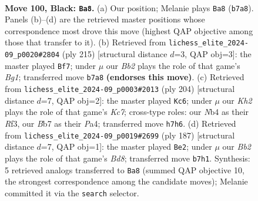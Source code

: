 \documentclass[11pt]{article}
\begin{document}
\clearpage

\begin{figure}[p]\centering
\begin{subfigure}{0.46\textwidth}\centering
\resizebox{\linewidth}{!}{%
\newchessgame
\chessboard[
  setfen={8/1b5k/8/8/1n1B4/7K/5P2/8 b - - 46 100},
  showmover=false,
  pgfstyle=straightmove, color=movearrow, markmove={b7-a8}
]}
\caption{}
\end{subfigure}\hfill
\begin{subfigure}{0.46\textwidth}\centering
\resizebox{\linewidth}{!}{%
\newchessgame
\chessboard[
  setfen={6b1/8/5P2/8/3B4/K7/2k5/8 b - - 30 108},
  showmover=false,
  pgfstyle=straightmove, color=movearrow, markmove={g8-f7}
]}
\caption{}
\end{subfigure}
\\[4pt]
\begin{subfigure}{0.46\textwidth}\centering
\resizebox{\linewidth}{!}{%
\newchessgame
\chessboard[
  setfen={8/2K5/4k3/p7/P7/5R2/3b4/8 w - - 68 103},
  showmover=false,
  pgfstyle=straightmove, color=movearrow, markmove={c7-c6}
]}
\caption{}
\end{subfigure}\hfill
\begin{subfigure}{0.46\textwidth}\centering
\resizebox{\linewidth}{!}{%
\newchessgame
\chessboard[
  setfen={6B1/8/8/8/3k4/P7/1K6/3b4 b - - 10 94},
  showmover=false,
  pgfstyle=straightmove, color=movearrow, markmove={d1-e2}
]}
\caption{}
\end{subfigure}
\caption{\textbf{Move 100, Black: \texttt{Ba8}.} (a) Our position; Melanie plays \texttt{Ba8} (\texttt{b7a8}). Panels (b)--(d) are the retrieved master positions whose correspondence most drove this move (highest QAP objective among those that transfer to it). (b) Retrieved from \texttt{lichess\_elite\_2024-09\_p0020\#2804} (ply 215) [structural distance $d$=3, QAP obj=3]: the master played \texttt{Bf7}; under $\mu$ our \emph{Bb2} plays the role of that game's \emph{Bg1}; transferred move \texttt{b7a8} \textbf{(endorses this move)}. (c) Retrieved from \texttt{lichess\_elite\_2024-09\_p0003\#2013} (ply 204) [structural distance $d$=7, QAP obj=2]: the master played \texttt{Kc6}; under $\mu$ our \emph{Kh2} plays the role of that game's \emph{Kc7}; cross-type roles: our \emph{N}b4 as their \emph{R}f3, our \emph{B}b7 as their \emph{P}a4; transferred move \texttt{h7h6}. (d) Retrieved from \texttt{lichess\_elite\_2024-09\_p0019\#2699} (ply 187) [structural distance $d$=7, QAP obj=1]: the master played \texttt{Be2}; under $\mu$ our \emph{Bb2} plays the role of that game's \emph{Bd8}; transferred move \texttt{b7h1}. Synthesis: 5 retrieved analogs transferred to \texttt{Ba8} (summed QAP objective 10, the strongest correspondence among the candidate moves); Melanie committed it via the \texttt{search} selector.}
\label{fig:thought-m199}
\end{figure}
\end{document}
